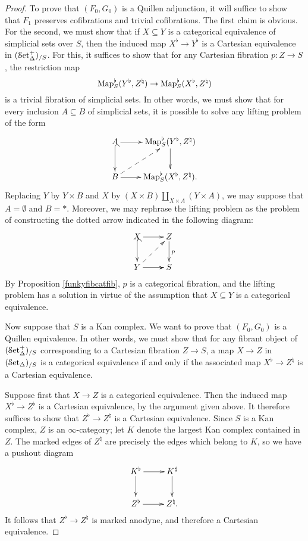\begin{proof}
To prove that $(F_0,G_0)$ is a Quillen adjunction, it will suffice to show that $F_1$ preserves cofibrations and trivial cofibrations. The first claim is obvious. For the second, we must show that if
$X \subseteq Y$ is a categorical equivalence of simplicial sets over $S$, then the induced map
$X^{\flat} \rightarrow Y^{\flat}$ is a Cartesian equivalence in $(\operatorname{\mathcal{S}et_{\Delta}^{+}})_{/S}$. For this, it suffices to
show that for any Cartesian fibration $p: Z \rightarrow S$, the restriction map
$$ \operatorname{{Map}}_{S}^{\flat}(Y^{\flat}, Z^{\natural}) \rightarrow \operatorname{{Map}}_{S}^{\flat}(X^{\flat},Z^{\natural})$$ is
a trivial fibration of simplicial sets. In other words, we must show that for every inclusion
$A \subseteq B$ of simplicial sets, it is possible to solve any lifting problem of the form
$$ \xymatrix{ A \ar[r] \ar@{^{(}->}[d] & \bHom_{S}^{\flat}(Y^{\flat}, Z^{\natural}) \ar[d] \\
B \ar[r] \ar@{-->}[ur] & \bHom_{S}^{\flat}(X^{\flat}, Z^{\natural}). }$$
Replacing $Y$ by $Y \times B$ and $X$ by $(X \times B) \coprod_{ X \times A} (Y \times A)$, 
we may suppose that $A = \emptyset$ and $B = \ast$. Moreover, we may rephrase the lifting problem as the problem of constructing the dotted arrow indicated in the following diagram:
$$ \xymatrix{ X \ar@{^{(}->}[d] \ar[r] & Z \ar[d]^{p} \\
Y \ar[r] \ar@{-->}[ur] \ar[r] & S }$$
By Proposition \ref{funkyfibcatfib}, $p$ is a categorical fibration, and the lifting problem has a solution in virtue of the assumption that $X \subseteq Y$ is a categorical equivalence.

Now suppose that $S$ is a Kan complex. We want to prove that $(F_0,G_0)$ is a Quillen equivalence. In other words, we must show that for any fibrant object of $(\operatorname{\mathcal{S}et_{\Delta}^{+}})_{/S}$ corresponding to a Cartesian fibration $Z \rightarrow S$, a map $X \rightarrow Z$ in $(\operatorname{\mathcal{S}et_{\Delta}})_{/S}$ is a categorical equivalence if and only if the associated map $X^{\flat} \rightarrow Z^{\natural}$ is a Cartesian equivalence.

Suppose first that $X \rightarrow Z$ is a categorical equivalence. Then the induced map
$X^{\flat} \rightarrow Z^{\flat}$ is a Cartesian equivalence, by the argument given above. It therefore suffices to show that $Z^{\flat} \rightarrow Z^{\natural}$ is a Cartesian equivalence.
Since $S$ is a Kan complex, $Z$ is an $\infty$-category; let $K$ denote the largest Kan complex contained in $Z$. The marked edges of $Z^{\natural}$ are precisely the edges which belong to $K$, so we have a pushout diagram
$$ \xymatrix{ K^{\flat} \ar[r] \ar[d] & K^{\sharp} \ar[d] \\
Z^{\flat} \ar[r] & Z^{\natural}. }$$
It follows that $Z^{\flat} \rightarrow Z^{\natural}$ is marked anodyne, and therefore a Cartesian equivalence.


\end{proof}
